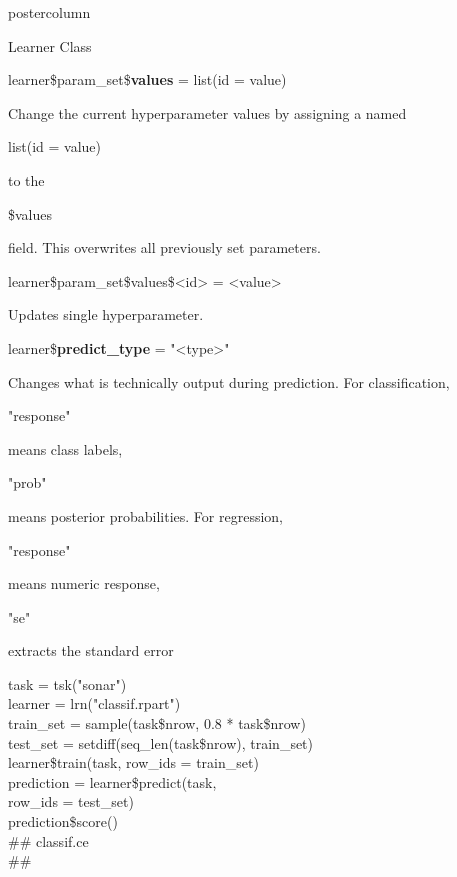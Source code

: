 \documentclass{beamer}
\newcommand{\codeinline}[1]{\begin{codeboxinline}#1\end{codeboxinline}}
\begin{document}
\begin{frame}[fragile]{}
\begin{columns}
\begin{column}{.245\textwidth}
\begin{beamercolorbox}[center]{postercolumn}
\begin{minipage}{.98\textwidth}
{\begin{myblock}{Learner Class}
						\begin{codebox}
							learner\$param\_set\$\textbf{values} = list(id = value)
						\end{codebox}
						Change the current hyperparameter values by assigning a named \codeinline{list(id = value)} to the \codeinline{\$values} field.
						This overwrites all previously set parameters.	
						\\
						\begin{codebox}
							learner\$param\_set\$values\$<id> = <value>
						\end{codebox}
						Updates single hyperparameter.
						\vspace{1em}
						\\
						\begin{codebox}
							learner\$\textbf{predict\_type} = "<type>"
						\end{codebox}
						Changes what is technically output during prediction. For classification, 
                        \codeinline{"response"} means class labels, \codeinline{"prob"} means posterior probabilities. For regression, \codeinline{"response"} means numeric response, 
                        \codeinline{"se"} extracts the standard error 
						\vspace{1em}
						\begin{codeboxexample}
							{\footnotesize
								task = tsk("sonar")\\
								learner = lrn("classif.rpart")
								\vspace{1em}
								\\
								train\_set = sample(task\$nrow, 0.8 * task\$nrow)\\
								test\_set = setdiff(seq\_len(task\$nrow), train\_set)
								\vspace{1em}
								\\
								learner\$train(task, row\_ids = train\_set)
								\vspace{1em}
								\\
								prediction = learner\$predict(task,\\
								\hspace*{1ex} row\_ids = test\_set)\\
								prediction\$score()\\
								\#\# classif.ce\\
								\#\# }
						\end{codeboxexample}
					\end{myblock}
					\vfill
					}
				\end{minipage}

\end{beamercolorbox}
\end{column}
\end{columns}
\end{frame}
\end{document}
